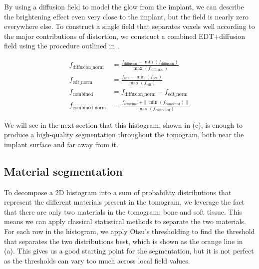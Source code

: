 By using a diffusion field to model the glow from the implant, we can describe
the brightening effect even very close to the implant, but the field is nearly
zero everywhere else. To construct a single field that separates voxels well
according to the major contributions of distortion, we construct a combined
EDT+diffusion field using the procedure outlined in .

\begin{equation}
    \label{eq:field-comb}
    \begin{split}
        f_{\text{diffusion\_norm}} &= \frac{f_{\text{diffusion}} - \min (f_{\text{diffusion}})}{\max (f_{\text{diffusion}})} \\
        f_{\text{edt\_norm}} &= \frac{f_{\text{edt}} - \min (f_{\text{edt}})}{\max (f_{\text{edt}})} \\
        f_{\text{combined}} &= f_{\text{diffusion\_norm}} - f_{\text{edt\_norm}} \\
        f_{\text{combined\_norm}} &= \frac{f_{\text{combined}} + \|\min (f_{\text{combined}})\|}{\max (f_{\text{combined}})}
    \end{split}
\end{equation}

We will see in the next section that this histogram, shown in
(c), is enough to produce a high-quality segmentation
throughout the tomogram, both near the implant surface and far away from it.

\subsection{Material segmentation}

To decompose a 2D histogram into a sum of probability distributions that
represent the different materials present in the tomogram, we leverage the fact
that there are only two materials in the tomogram: bone and soft tissue. This
means we can apply classical statistical methods to separate the two materials.
For each row in the histogram, we apply Otsu's thresholding to find the
threshold that separates the two distributions best, which is shown as the
orange line in (a). This gives us a good starting point for the
segmentation, but it is not perfect as the thresholds can vary too much across
local field values.

